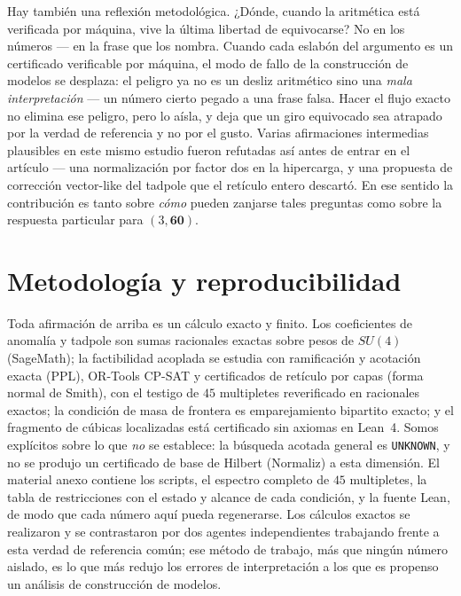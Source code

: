 \documentclass[11pt,a4paper]{article}
\begin{document}
Hay tambi\'en una reflexi\'on metodol\'ogica. ¿D\'onde, cuando la aritm\'etica est\'a
verificada por m\'aquina, vive la \'ultima libertad de equivocarse? No en los n\'umeros --- en
la frase que los nombra. Cuando cada eslab\'on del argumento es un certificado verificable por
m\'aquina, el modo de fallo de la construcci\'on de modelos se desplaza: el peligro ya no es un
desliz aritm\'etico sino una \emph{mala interpretaci\'on} --- un n\'umero cierto pegado a una
frase falsa. Hacer el flujo exacto no elimina ese peligro, pero lo a\'isla, y deja que un giro
equivocado sea atrapado por la verdad de referencia y no por el gusto. Varias afirmaciones
intermedias plausibles en este mismo estudio fueron refutadas as\'i antes de entrar en el
art\'iculo --- una normalizaci\'on por factor dos en la hipercarga, y una propuesta de
correcci\'on vector-like del tadpole que el ret\'iculo entero descart\'o. En ese sentido la
contribuci\'on es tanto sobre \emph{c\'omo} pueden zanjarse tales preguntas como sobre la
respuesta particular para $(3,\mathbf{60})$.

\section{Metodolog\'ia y reproducibilidad}\label{sec:method}
Toda afirmaci\'on de arriba es un c\'alculo exacto y finito. Los coeficientes de anomal\'ia y
tadpole son sumas racionales exactas sobre pesos de $SU(4)$ (SageMath); la factibilidad
acoplada se estudia con ramificaci\'on y acotaci\'on exacta (PPL), OR-Tools CP-SAT y
certificados de ret\'iculo por capas (forma normal de Smith), con el testigo de $45$
multipletes reverificado en racionales exactos; la condici\'on de masa de frontera es
emparejamiento bipartito exacto; y el fragmento de c\'ubicas localizadas est\'a certificado sin
axiomas en Lean~4. Somos expl\'icitos sobre lo que \emph{no} se establece: la b\'usqueda acotada
general es \texttt{UNKNOWN}, y no se produjo un certificado de base de Hilbert (Normaliz) a esta
dimensi\'on. El material anexo contiene los scripts, el espectro completo de $45$ multipletes, la
tabla de restricciones con el estado y alcance de cada condici\'on, y la fuente Lean, de modo que
cada n\'umero aqu\'i pueda regenerarse. Los c\'alculos exactos se realizaron y se contrastaron
por dos agentes independientes trabajando frente a esta verdad de referencia com\'un; ese
m\'etodo de trabajo, m\'as que ning\'un n\'umero aislado, es lo que m\'as redujo los errores de
interpretaci\'on a los que es propenso un an\'alisis de construcci\'on de modelos.
\end{document}

